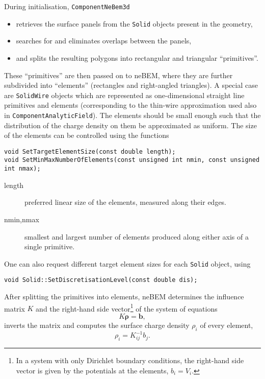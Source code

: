 During initialisation, \texttt{ComponentNeBem3d}
\begin{itemize}
\item
retrieves the surface panels from the \texttt{Solid} objects 
present in the geometry,
\item
searches for and eliminates overlaps between the panels,  
\item
and splits the resulting polygons into rectangular and triangular ``primitives''.
\end{itemize}
These ``primitives'' are then passed on to neBEM, where they are further 
subdivided into ``elements'' (rectangles and right-angled triangles).
A special case are \texttt{SolidWire} objects which are represented 
as one-dimensional straight line primitives and elements 
(corresponding to the thin-wire approximation used also 
in \texttt{ComponentAnalyticField}). 
The elements should be small enough such that the distribution of the 
charge density on them be approximated as uniform.
The size of the elements can be controlled using the functions
\begin{lstlisting}
void SetTargetElementSize(const double length);
void SetMinMaxNumberOfElements(const unsigned int nmin, const unsigned int nmax);
\end{lstlisting}
\begin{description}
\item[length] preferred linear size of the elements, measured along their edges.
\item[nmin,nmax] smallest and largest number of elements produced along either axis of a single primitive.
\end{description}
One can also request different target element sizes for each 
\texttt{Solid} object, using
\begin{lstlisting}
void Solid::SetDiscretisationLevel(const double dis);
\end{lstlisting} 

After splitting the primitives into elements, 
neBEM determines the influence matrix $K$ and 
the right-hand side vector\footnote{In a system with only Dirichlet 
boundary conditions, the right-hand side vector is given by the 
potentials at the elements, $b_{i} = V_{i}$.}
of the system of equations
\begin{equation*}
K \boldsymbol{\rho} = \mathbf{b},
\end{equation*}
inverts the matrix and computes the surface charge density $\rho_{i}$ 
of every element,
\begin{equation*}
\rho_{i} = K^{-1}_{ij} b_{j}. 
\end{equation*}

